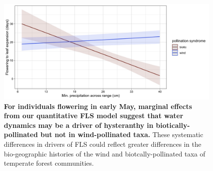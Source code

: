 \documentclass{article}
\begin{document}
 \begin{figure}[h!]
        \centering
          \includegraphics[width=\textwidth]{..//HarvardForest/apcs.jpeg}
           \caption{\textbf{ For individuals flowering in early May, marginal effects from our quantitative FLS model suggest that water dynamics may be a driver of hysteranthy in biotically-pollinated but not in wind-pollinated taxa.}  These systematic differences in drivers of FLS could reflect greater differences in the bio-geographic histories of the wind and biotcally-pollinated taxa of temperate forest communities.}
        \label{fig:apcs}
    \end{figure}
 

    
\end{document}
